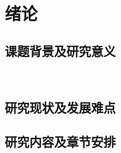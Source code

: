 \section{绪论}
\setcounter{figure}{0}

\subsection{课题背景及研究意义}\

\subsection{研究现状及发展难点}

\subsection{研究内容及章节安排}


